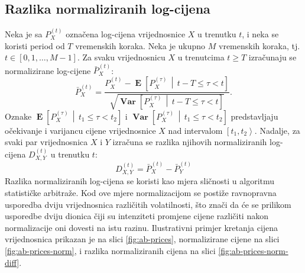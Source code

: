 \documentclass[lmodern, utf8, diplomski, numeric]{fer}
\newcommand{\Efromto}[2]{\operatorname{\mathbf{E}}\q[#1\, \middle\vert\, #2\w]}
\newcommand{\Varfromto}[2]{\operatorname{\mathbf{Var}}\q[#1\, \middle\vert\, #2\w]}
\newcommand{\norm}[1]{\bar{#1}}
\newcommand{\q}{\left}
\newcommand{\w}{\right}
\begin{document}
  \subsection{Razlika normaliziranih log-cijena}
  Neka je sa $P_X^{\q(t\w)}$ označena log-cijena vrijednosnice $X$ u trenutku $t$, i neka se koristi period od $T$ vremenskih koraka.
  Neka je ukupno $M$ vremenskih koraka, tj. $t \in \q[0, 1, \ldots, M - 1\w]$.
  Za svaku vrijednosnicu $X$ u trenutcima $t \ge T$ izračunaju se normalizirane log-cijene $\norm{P}_X^{\q(t\w)}$:
  \begin{equation}
  \norm{P}_X^{\q(t\w)} = \frac{P_X^{\q(t\w)} - \Efromto{P_X^{(\tau)}}{t-T \le \tau < t}}{\sqrt{\Varfromto{P_X^{(\tau)}}{t-T \le \tau < t}}}.
  \end{equation}
  Oznake $\Efromto{P_X^{(\tau)}}{t_1 \le \tau < t_2}$ i $\Varfromto{P_X^{(\tau)}}{t_1 \le \tau < t_2}$ predstavljaju očekivanje i varijancu cijene vrijednosnice $X$ nad intervalom $\q[t_1, t_2\w\rangle$.
  Nadalje, za svaki par vrijednosnica $X$ i $Y$ izračuna se razlika njihovih normaliziranih log-cijena $D_{X,Y}^{\q(t\w)}$ u trenutku $t$:
  \begin{equation}
  D_{X,Y}^{\q(t\w)} = \norm{P}_X^{\q(t\w)} - \norm{P}_Y^{\q(t\w)}
  \end{equation}
  Razlika normaliziranih log-cijena se koristi kao mjera sličnosti u algoritmu statističke arbitraže.
  Kod ove mjere normalizacijom se postiže ravnopravna usporedba dviju vrijednosnica različitih volatilnosti, što znači da će se prilikom usporedbe dviju dionica čiji su intenziteti promjene cijene različiti nakon normalizacije oni dovesti na istu razinu.
  Ilustrativni primjer kretanja cijena vrijednosnica prikazan je na slici \ref{fig:ab-prices}, normalizirane cijene na slici \ref{fig:ab-prices-norm}, i razlika normaliziranih cijena na slici \ref{fig:ab-prices-norm-diff}.
  
\end{document}
